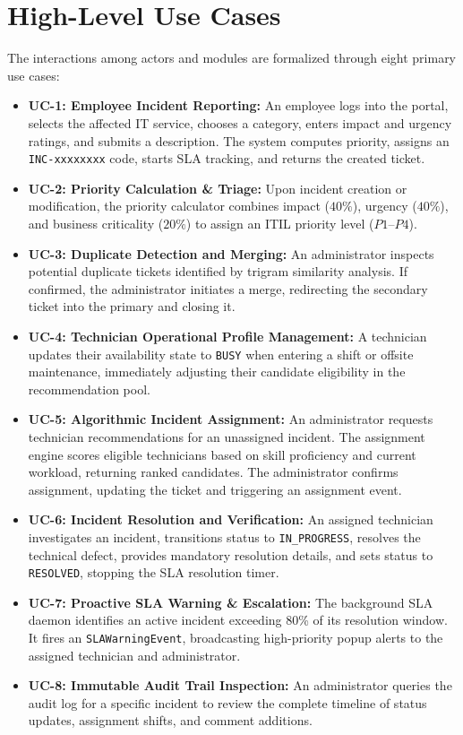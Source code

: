 \documentclass[11pt,a4paper,oneside]{report}
\begin{document}
\section{High-Level Use Cases}
\label{sec:req_use_cases}
The interactions among actors and modules are formalized through eight primary use cases:
\begin{itemize}
    \item \textbf{UC-1: Employee Incident Reporting:} An employee logs into the portal, selects the affected IT service, chooses a category, enters impact and urgency ratings, and submits a description. The system computes priority, assigns an \texttt{INC-xxxxxxxx} code, starts SLA tracking, and returns the created ticket.
    \item \textbf{UC-2: Priority Calculation \& Triage:} Upon incident creation or modification, the priority calculator combines impact ($40\%$), urgency ($40\%$), and business criticality ($20\%$) to assign an ITIL priority level ($P1$--$P4$).
    \item \textbf{UC-3: Duplicate Detection and Merging:} An administrator inspects potential duplicate tickets identified by trigram similarity analysis. If confirmed, the administrator initiates a merge, redirecting the secondary ticket into the primary and closing it.
    \item \textbf{UC-4: Technician Operational Profile Management:} A technician updates their availability state to \texttt{BUSY} when entering a shift or offsite maintenance, immediately adjusting their candidate eligibility in the recommendation pool.
    \item \textbf{UC-5: Algorithmic Incident Assignment:} An administrator requests technician recommendations for an unassigned incident. The assignment engine scores eligible technicians based on skill proficiency and current workload, returning ranked candidates. The administrator confirms assignment, updating the ticket and triggering an assignment event.
    \item \textbf{UC-6: Incident Resolution and Verification:} An assigned technician investigates an incident, transitions status to \texttt{IN\_PROGRESS}, resolves the technical defect, provides mandatory resolution details, and sets status to \texttt{RESOLVED}, stopping the SLA resolution timer.
    \item \textbf{UC-7: Proactive SLA Warning \& Escalation:} The background SLA daemon identifies an active incident exceeding 80\% of its resolution window. It fires an \texttt{SLAWarningEvent}, broadcasting high-priority popup alerts to the assigned technician and administrator.
    \item \textbf{UC-8: Immutable Audit Trail Inspection:} An administrator queries the audit log for a specific incident to review the complete timeline of status updates, assignment shifts, and comment additions.
\end{itemize}
\end{document}
